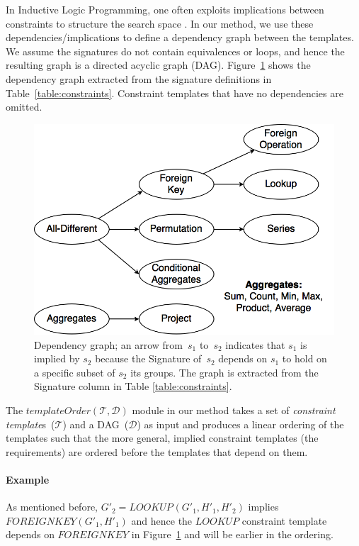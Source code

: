 \documentclass{IEEEtran}
\newcommand{\constraints}{\ensuremath{\mathcal{T}}\xspace}
\newcommand{\format}[1]{\textit{#1}\xspace}
\newcommand{\constrainttorder}{\format{templateOrder}}
\newcommand{\template}{\format{constraint template}}
\newcommand{\CSignature}{Signature\xspace}
\newcommand{\dependencies}{\ensuremath{\mathcal{D}}\xspace}
\newcommand{\eccalc}[2]{\ensuremath{#1 = #2}}
\newcommand{\ecfkey}[2]{\ensuremath{\textit{FOREIGNKEY}(#1,#2)}}
\newcommand{\eclookupf}[4]{\ensuremath{\textit{LOOKUP}_{\textit{#4}}(#1, #2, #3)}}
\newcommand{\eclookup}[4]{\eccalc{#1}{\eclookupf{#2}{#3}{#4}{}}}
\theoremstyle{definition}
\begin{document}
In Inductive Logic Programming, one often exploits implications between constraints to structure the search space \cite{luc_book}.
In our method, we use these dependencies/implications to define a dependency graph between the templates. We assume the signatures do not contain equivalences or loops, and hence the resulting graph is a directed acyclic graph (DAG).
Figure~\ref{fig:learning_order} shows the dependency graph extracted from the signature definitions in Table~\ref{table:constraints}. 
Constraint templates that have no dependencies are omitted. 

\begin{figure}[t]
  \centering
  \includegraphics[width=0.8\linewidth]{figures/constraint_dependency.png}
  \caption{Dependency graph; an arrow from~$s_1$ to~$s_2$ indicates that $s_1$ is implied by $s_2$ because the \CSignature of~$s_2$ depends on $s_1$ to hold on a specific subset of $s_2$ its groups.
    The graph is extracted from the Signature column in Table \ref{table:constraints}.
  }
  \label{fig:learning_order}
\end{figure}

The $\constrainttorder(\constraints,\dependencies)$ module in our method takes a set of {\template}s~(\constraints) and a DAG~(\dependencies) as input and produces a linear ordering of the templates such that the more general, implied constraint templates (the requirements) are ordered before the templates that depend on them.

\paragraph{Example}
As mentioned before, $\eclookup{G'_2}{G'_1}{H'_1}{H'_2}$ implies $\ecfkey{G'_1}{H'_1}$ and hence the $LOOKUP$ constraint template depends on $FOREIGNKEY$ in Figure~\ref{fig:learning_order} and will be earlier in the ordering.
\end{document}
